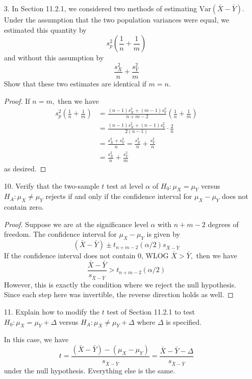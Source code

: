 \documentclass{article}
\newcommand{\var}{\mathrm{Var}}
\begin{document}
\begin{itemize}
	\item[3.] In Section 11.2.1, we considered two methods of estimating $\var(\bar{X}-\bar{Y}).$ Under the assumption that the two population variances were equal, we estimated this quantity by \[s_p^2\left( \frac{1}{n}+\frac{1}{m} \right)\] and without this assumption by \[\frac{s_X^2}{n}+\frac{s_Y^2}{m}\] Show that these two estimates are identical if $m=n.$
		\begin{proof}
			If $n=m,$ then we have
			\begin{align*}
				s_p^2\left( \frac{1}{n}+\frac{1}{m} \right) &= \frac{(n-1)s_X^2+(m-1)s_Y^2}{n+m-2} \left( \frac{1}{n}+\frac{1}{m} \right) \\
				&= \frac{(n-1)s_X^2 + (n-1)s_Y^2}{2(n-1)}\cdot\frac{2}{n} \\
				&= \frac{s_X^2+s_Y^2}{n} = \frac{s_X^2}{n} + \frac{s_Y^2}{n} \\
				&= \frac{s_X^2}{n} + \frac{s_Y^2}{m}
			\end{align*}
			as desired.
		\end{proof}

	\item[10.] Verify that the two-sample $t$ test at level $\alpha$ of $H_0:\mu_X=\mu_Y$ versus $H_A:\mu_X\neq\mu_Y$ rejects if and only if the confidence interval for $\mu_X-\mu_Y$ does not contain zero.
		\begin{proof}
			Suppose we are at the significance level $\alpha$ with $n+m-2$ degrees of freedom. The confidence interval for $\mu_X-\mu_Y$ is given by \[(\bar{X}-\bar{Y}) \pm t_{n+m-2}(\alpha/2) s_{\bar{X}-\bar{Y}}\] If the confidence interval does not contain 0, WLOG $\bar{X}>\bar{Y},$ then we have \[\frac{\bar{X}-\bar{Y}}{s_{\bar{X}-\bar{Y}}} > t_{n+m-2}(\alpha/2)\] However, this is exactly the condition where we reject the null hypothesis. Since each step here was invertible, the reverse direction holds as well.
		\end{proof}

	\item[11.] Explain how to modify the $t$ test of Section 11.2.1 to test $H_0: \mu_X=\mu_Y+\Delta$ versus $H_A: \mu_X\neq \mu_Y+\Delta$ where $\Delta$ is specified.
		\begin{answer*}
			In this case, we have \[t=\frac{(\bar{X}-\bar{Y})-(\mu_X-\mu_Y)}{s_{\bar{X}-\bar{Y}}}=\frac{\bar{X}-\bar{Y}-\Delta}{s_{\bar{X}-\bar{Y}}}\] under the null hypothesis. Everything else is the same.
		\end{answer*}
		
\end{itemize}
\end{document}
